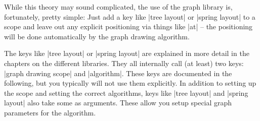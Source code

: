 While this theory may sound complicated, the use of the graph library
is, fortunately, pretty simple: Just add a key like |tree layout| or
|spring layout| to a scope and leave out any explicit positioning via
things like |at| -- the positioning will be done automatically by the
graph drawing algorithm.

The keys like |tree layout| or |spring layout| are explained in more detail
in the chapters on the different libraries. They all internally call
(at least) two keys: |graph drawing scope| and |algorithm|. These
keys are documented in the following, but you typically will not use
them explicitly. In addition to setting up the scope and setting the
correct algorithms, keys like |tree layout| and |spring layout| also take
some  as arguments. These  allow you setup
special graph parameters for the algorithm.

